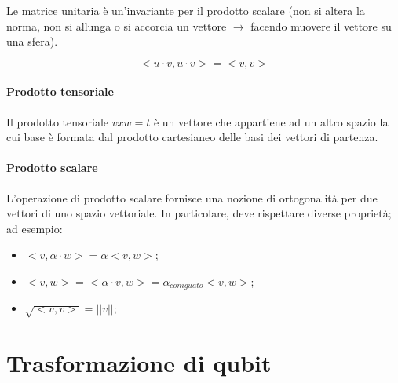 \documentclass{article}
\begin{document}
Le matrice unitaria è un'invariante per il prodotto scalare (non si altera la norma, non si allunga o si accorcia un vettore $\rightarrow$ facendo muovere il vettore su una sfera). 

\begin{equation*}
    <u\cdot v,u\cdot v> = <v, v>
\end{equation*}

\paragraph{Prodotto tensoriale}

Il prodotto tensoriale $v x w = t$ è un vettore che appartiene ad un altro spazio la cui base è formata dal prodotto cartesianeo delle basi dei vettori di partenza.

\paragraph{Prodotto scalare}
L'operazione di prodotto scalare fornisce una nozione di ortogonalità per due vettori di uno spazio vettoriale. In particolare, deve rispettare diverse proprietà; ad esempio:

\begin{itemize}
    \item $<v, \alpha \cdot w> = \alpha <v, w>$;
    \item $<v, w> = <\alpha \cdot v, w> = \alpha_{coniguato} <v, w>$;
    \item $\sqrt{<v, v>} = ||v||$;
\end{itemize}

\section{Trasformazione di qubit}
\end{document}

